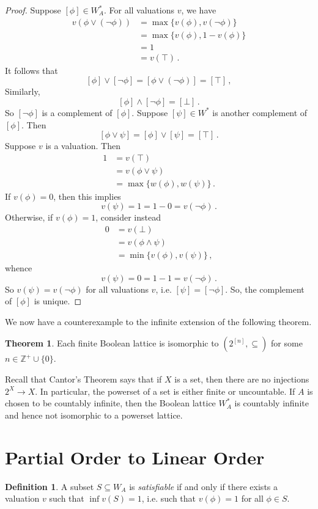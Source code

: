 \documentclass[12pt]{article}
\theoremstyle{definition}
\newtheorem*{definition}{\color{OliveGreen} Definition}
\newtheorem*{theorem}{\color{blue} Theorem}
\begin{document}
\begin{multicols*}{2}
\begin{proof}
	Suppose $[\phi]\in W_A^\ast$. For all valuations $v$, we have
	\begin{align*}
		v(\phi\lor(\neg\phi)) &= \max\{v(\phi), v(\neg \phi)\} \\
		&= \max\{v(\phi), 1 - v(\phi)\} \\
		&= 1 \\
		&= v(\top)\,.
	\end{align*}
	It follows that \[[\phi]\lor[\neg\phi] = [\phi\lor(\neg\phi)] = [\top]\,,\] Similarly,
	\[
		[\phi]\land[\neg\phi] = [\bot]\,.
	\]
	So $[\neg\phi]$ is a complement of $[\phi]$. Suppose $[\psi]\in W^\ast$ is another complement of $[\phi]$. Then
	\[
		[\phi\lor\psi] = [\phi]\lor[\psi] = [\top]\,.
	\]
	Suppose $v$ is a valuation. Then
	\begin{align*}
		1 &= v(\top) \\
		&= v(\phi\lor\psi) \\
		&= \max\{w(\phi), w(\psi)\}\,.
	\end{align*}
	If $v(\phi)=0$, then this implies \[v(\psi) = 1 = 1-0 = v(\neg\phi)\,.\] Otherwise, if $v(\phi)=1$, consider instead
	\begin{align*}
		0 &= v(\bot) \\
		&= v(\phi\land\psi) \\
		&= \min\{v(\phi), v(\psi)\}\,,
	\end{align*}
	whence
	\[v(\psi)=0 = 1-1 = v(\neg\phi)\,.\] So $v(\psi) = v(\neg\phi)$ for all valuations $v$, i.e. $[\psi] = [\neg\phi]$. So, the complement of $[\phi]$ is unique.
\end{proof}

We now have a counterexample to the infinite extension of the following theorem.
\begin{theorem}
	Each finite Boolean lattice is isomorphic to $(2^{[n]}, \subseteq)$ for some $n\in\mathbb{Z}^+\cup\{0\}$.
\end{theorem}
Recall that Cantor's Theorem says that if $X$ is a set, then there are no injections $2^X\rightarrow X$. In particular, the powerset of a set is either finite or uncountable. If $A$ is chosen to be countably infinite, then the Boolean lattice $W_A^\ast$ is countably infinite and hence not isomorphic to a powerset lattice.

\section*{Partial Order to Linear Order}

\begin{definition}
	A subset $S\subseteq W_A$ is \emph{satisfiable} if and only if there exists a valuation $v$ such that $\inf v(S) = 1$, i.e. such that $v(\phi)=1$ for all $\phi\in S$.
\end{definition}


\end{multicols*}
\end{document}

